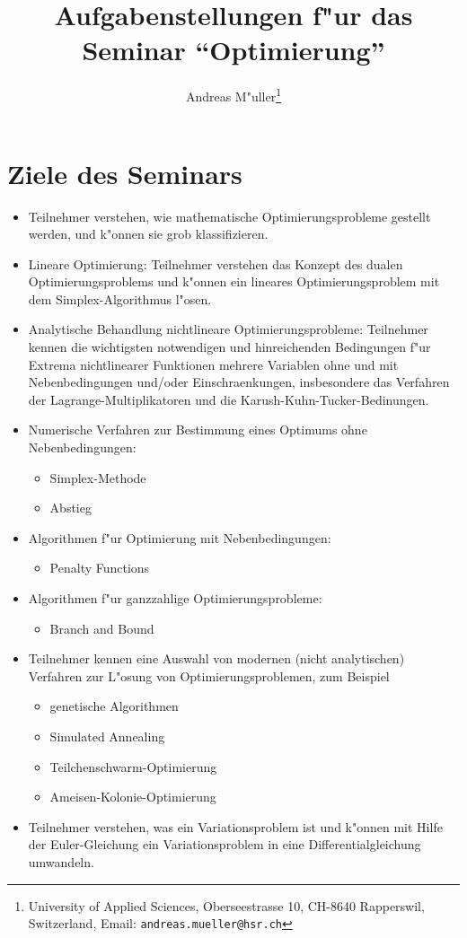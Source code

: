 \documentclass[a4paper,12pt]{article}
\begin{document}
\title{Aufgabenstellungen f"ur das Seminar ``Optimierung''}
\author{Andreas M"uller\footnote{
University of Applied Sciences, Oberseestrasse 10, CH-8640 Rapperswil,
Switzerland, Email: {\tt andreas.mueller@hsr.ch}}}
\date{}
\maketitle
\section{Ziele des Seminars}
\begin{itemize}
\item
Teilnehmer verstehen, wie mathematische Optimierungsprobleme gestellt
werden, und k"onnen sie grob klassifizieren.
\item
Lineare Optimierung: Teilnehmer verstehen das Konzept des dualen
Optimierungsproblems und k"onnen ein lineares Optimierungsproblem
mit dem Simplex-Algorithmus l"osen.
\item
Analytische Behandlung nichtlineare Optimierungsprobleme:  Teilnehmer
kennen die wichtigsten notwendigen und hinreichenden Bedingungen f"ur
Extrema nichtlinearer Funktionen mehrere Variablen ohne und mit
Nebenbedingungen und/oder Einschraenkungen, insbesondere das Verfahren
der Lagrange-Multiplikatoren und die Karush-Kuhn-Tucker-Bedinungen.
\item
Numerische Verfahren zur Bestimmung eines Optimums ohne Nebenbedingungen:
\begin{itemize}
\item Simplex-Methode
\item Abstieg
\end{itemize}
\item
Algorithmen f"ur Optimierung mit Nebenbedingungen:
\begin{itemize}
\item Penalty Functions
\end{itemize}

\item
Algorithmen f"ur ganzzahlige Optimierungsprobleme:
\begin{itemize}
\item Branch and Bound
\end{itemize}

\item
Teilnehmer kennen eine Auswahl von modernen (nicht analytischen) Verfahren
zur L"osung von Optimierungsproblemen, zum Beispiel
\begin{itemize}
\item genetische Algorithmen
\item Simulated Annealing
\item Teilchenschwarm-Optimierung
\item Ameisen-Kolonie-Optimierung
\end{itemize}

\item
Teilnehmer verstehen, was ein Variationsproblem ist und k"onnen mit
Hilfe der Euler-Gleichung ein Variationsproblem in eine
Differentialgleichung umwandeln.
\end{itemize}
\end{document}
